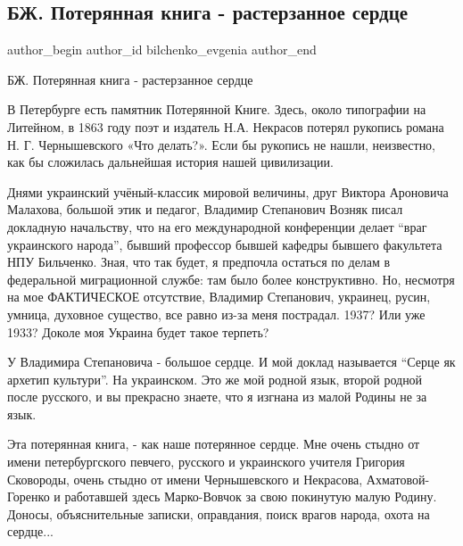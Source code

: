  
 
 
 
 
 
\subsection{БЖ. Потерянная книга - растерзанное сердце}
\label{sec:12_02_2022.tg.bilchenko_evgenia.2.poterjannaja_kniga}
 
\ifcmt
 author_begin
   author_id bilchenko_evgenia
 author_end
\fi

БЖ. Потерянная книга - растерзанное сердце

В Петербурге есть памятник Потерянной Книге. Здесь, около типографии на
Литейном, в 1863 году поэт и издатель Н.А. Некрасов потерял рукопись романа
Н. Г. Чернышевского «Что делать?». Если бы рукопись не нашли, неизвестно, как бы
сложилась дальнейшая история нашей цивилизации.


Днями украинский учёный-классик мировой величины, друг Виктора Ароновича
Малахова, большой этик и педагог, Владимир Степанович Возняк писал докладную
начальству, что на его международной конференции делает \enquote{враг украинского
народа}, бывший профессор бывшей кафедры бывшего факультета НПУ Бильченко.
Зная, что так будет, я предпочла остаться по делам в федеральной миграционной
службе: там было более конструктивно. Но, несмотря на мое ФАКТИЧЕСКОЕ
отсутствие, Владимир Степанович, украинец, русин, умница, духовное существо,
все равно из-за меня пострадал. 1937? Или уже 1933? Доколе моя Украина будет
такое терпеть?

У Владимира Степановича - большое сердце. И мой доклад называется \enquote{Серце як
архетип культури}. На украинском. Это же мой родной язык, второй родной после
русского, и вы прекрасно знаете, что я изгнана из малой Родины не за язык. 

Эта потерянная книга, - как наше потерянное сердце. Мне очень стыдно от имени
петербургского певчего, русского и украинского учителя Григория Сковороды,
очень стыдно от имени Чернышевского и Некрасова, Ахматовой-Горенко и работавшей
здесь Марко-Вовчок за свою покинутую малую Родину. Доносы, объяснительные
записки, оправдания, поиск врагов народа, охота на сердце... 

